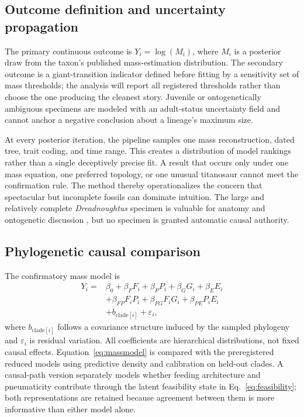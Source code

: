 \documentclass[conference]{IEEEtran}
\begin{document}
\subsection{Outcome definition and uncertainty propagation}

The primary continuous outcome is $Y_i=\log(M_i)$, where $M_i$ is a posterior draw from the taxon's published mass-estimation distribution. The secondary outcome is a giant-transition indicator defined before fitting by a sensitivity set of mass thresholds; the analysis will report all registered thresholds rather than choose the one producing the cleanest story. Juvenile or ontogenetically ambiguous specimens are modeled with an adult-status uncertainty field and cannot anchor a negative conclusion about a lineage's maximum size.

At every posterior iteration, the pipeline samples one mass reconstruction, dated tree, trait coding, and time range. This creates a distribution of model rankings rather than a single deceptively precise fit. A result that occurs only under one mass equation, one preferred topology, or one unusual titanosaur cannot meet the confirmation rule. The method thereby operationalizes the concern that spectacular but incomplete fossils can dominate intuition. The large and relatively complete \emph{Dreadnoughtus} specimen is valuable for anatomy and ontogenetic discussion \cite{lacovara2014}, but no specimen is granted automatic causal authority.

\subsection{Phylogenetic causal comparison}

The confirmatory mass model is
\begin{equation}
\begin{aligned}
Y_{i}={}&\beta_{0}+\beta_{F}F_{i}+\beta_{P}P_{i}+\beta_{G}G_{i}+\beta_{E}E_{i}\\
&+\beta_{FP}F_{i}P_{i}+\beta_{FG}F_{i}G_{i}+\beta_{PE}P_{i}E_{i}\\
&+b_{\mathrm{clade}[i]}+\varepsilon_{i},
\end{aligned}
\label{eq:massmodel}
\end{equation}
where $b_{\mathrm{clade}[i]}$ follows a covariance structure induced by the sampled phylogeny and $\varepsilon_i$ is residual variation. All coefficients are hierarchical distributions, not fixed causal effects. Equation~\eqref{eq:massmodel} is compared with the preregistered reduced models using predictive density and calibration on held-out clades. A causal-path version separately models whether feeding architecture and pneumaticity contribute through the latent feasibility state in Eq.~\eqref{eq:feasibility}; both representations are retained because agreement between them is more informative than either model alone.
\end{document}
